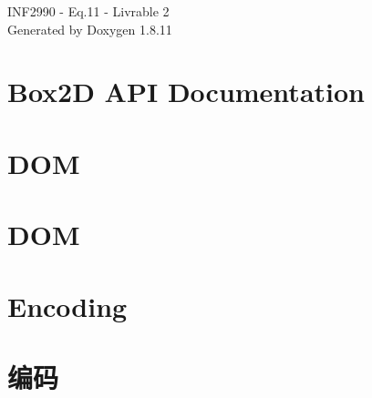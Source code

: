 \documentclass[twoside]{book}
\newcommand{\+}{\discretionary{\mbox{\scriptsize$\hookleftarrow$}}{}{}}
\newcommand{\clearemptydoublepage}{%
  \newpage{\pagestyle{empty}\cleardoublepage}%
}
\begin{document}
\hypersetup{pageanchor=false,
             bookmarksnumbered=true,
             pdfencoding=unicode
            }
\begin{titlepage}
\vspace*{7cm}
\begin{center}%
{\Large I\+N\+F2990 -\/ Eq.11 -\/ Livrable 2 }\\
\vspace*{1cm}
{\large Generated by Doxygen 1.8.11}\\
\end{center}
\end{titlepage}
\clearemptydoublepage
\tableofcontents
\clearemptydoublepage
{}
\hypersetup{pageanchor=true}

\chapter{Box2D A\+PI Documentation}
\label{index}\hypertarget{index}{}
\chapter{D\+OM}
\label{md_C:_Users_Bilal_Itani_Desktop_inf2990-11_Cadriciel_Commun_Externe_RapidJSON_doc_dom}
\hypertarget{md_C:_Users_Bilal_Itani_Desktop_inf2990-11_Cadriciel_Commun_Externe_RapidJSON_doc_dom}{}

\chapter{D\+OM}
\label{md_C:_Users_Bilal_Itani_Desktop_inf2990-11_Cadriciel_Commun_Externe_RapidJSON_doc_dom.zh-cn}
\hypertarget{md_C:_Users_Bilal_Itani_Desktop_inf2990-11_Cadriciel_Commun_Externe_RapidJSON_doc_dom.zh-cn}{}

\chapter{Encoding}
\label{md_C:_Users_Bilal_Itani_Desktop_inf2990-11_Cadriciel_Commun_Externe_RapidJSON_doc_encoding}
\hypertarget{md_C:_Users_Bilal_Itani_Desktop_inf2990-11_Cadriciel_Commun_Externe_RapidJSON_doc_encoding}{}

\chapter{编码}
\label{md_C:_Users_Bilal_Itani_Desktop_inf2990-11_Cadriciel_Commun_Externe_RapidJSON_doc_encoding.zh-cn}
\hypertarget{md_C:_Users_Bilal_Itani_Desktop_inf2990-11_Cadriciel_Commun_Externe_RapidJSON_doc_encoding.zh-cn}{}

\end{document}
